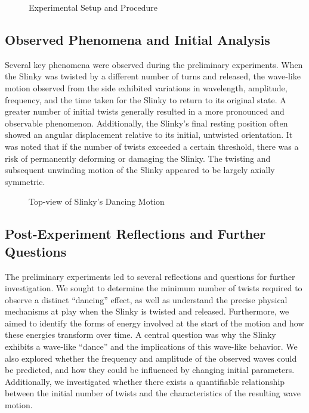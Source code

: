 \documentclass{mcmthesis}  %
\begin{document}
\begin{figure}[h!]
    \centering
    \caption{Experimental Setup and Procedure}
    \label{fig:exp_setup}
\end{figure}

\subsection{Observed Phenomena and Initial Analysis} %
Several key phenomena were observed during the preliminary experiments. When the Slinky was twisted by a different number of turns and released, the wave-like motion observed from the side exhibited variations in wavelength, amplitude, frequency, and the time taken for the Slinky to return to its original state. A greater number of initial twists generally resulted in a more pronounced and observable phenomenon. Additionally, the Slinky's final resting position often showed an angular displacement relative to its initial, untwisted orientation. It was noted that if the number of twists exceeded a certain threshold, there was a risk of permanently deforming or damaging the Slinky. The twisting and subsequent unwinding motion of the Slinky appeared to be largely axially symmetric.

\begin{figure}[h!]
    \centering
    \caption{Top-view of Slinky's Dancing Motion}
    \label{fig:top_view_phenomena}
\end{figure}

\subsection{Post-Experiment Reflections and Further Questions} %
The preliminary experiments led to several reflections and questions for further investigation. We sought to determine the minimum number of twists required to observe a distinct ``dancing'' effect, as well as understand the precise physical mechanisms at play when the Slinky is twisted and released. Furthermore, we aimed to identify the forms of energy involved at the start of the motion and how these energies transform over time. A central question was why the Slinky exhibits a wave-like ``dance'' and the implications of this wave-like behavior. We also explored whether the frequency and amplitude of the observed waves could be predicted, and how they could be influenced by changing initial parameters. Additionally, we investigated whether there exists a quantifiable relationship between the initial number of twists and the characteristics of the resulting wave motion.
\end{document}
